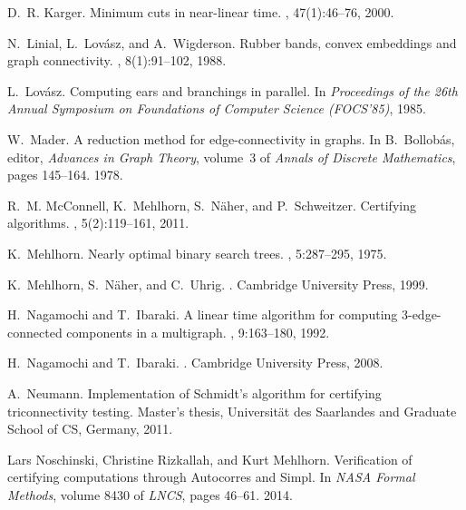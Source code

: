 \documentclass[paper=a4]{scrartcl}
\begin{document}
\begin{thebibliography}{10}
D.~R. Karger.
\newblock Minimum cuts in near-linear time.
, 47(1):46--76, 2000.

N.~Linial, L.~Lov{\'a}sz, and A.~Wigderson.
\newblock Rubber bands, convex embeddings and graph connectivity.
, 8(1):91--102, 1988.

L.~Lov\'asz.
\newblock Computing ears and branchings in parallel.
\newblock In {\em Proceedings of the 26th Annual Symposium on Foundations of
  Computer Science (FOCS'85)}, 1985.

W.~Mader.
\newblock A reduction method for edge-connectivity in graphs.
\newblock In B.~Bollob\'as, editor, {\em Advances in Graph Theory}, volume~3 of
  {\em Annals of Discrete Mathematics}, pages 145--164. 1978.

R.~M. McConnell, K.~Mehlhorn, S.~N\"aher, and P.~Schweitzer.
\newblock Certifying algorithms.
, 5(2):119--161, 2011.

K.~Mehlhorn.
\newblock Nearly optimal binary search trees.
, 5:287--295, 1975.

K.~Mehlhorn, S.~N{\"a}her, and C.~Uhrig.
.
\newblock Cambridge University Press, 1999.

H.~Nagamochi and T.~Ibaraki.
\newblock A linear time algorithm for computing 3-edge-connected components in
  a multigraph.
,
  9:163--180, 1992.

H.~Nagamochi and T.~Ibaraki.
.
\newblock Cambridge University Press, 2008.

A.~Neumann.
\newblock Implementation of {S}chmidt's algorithm for certifying
  triconnectivity testing.
\newblock Master's thesis, Universit\"at des Saarlandes and Graduate School of
  CS, Germany, 2011.

Lars Noschinski, Christine Rizkallah, and Kurt Mehlhorn.
\newblock Verification of certifying computations through {A}utocorres and
  {S}impl.
\newblock In {\em NASA Formal Methods}, volume 8430 of {\em LNCS}, pages
  46--61. 2014.


\end{thebibliography}
\end{document}

